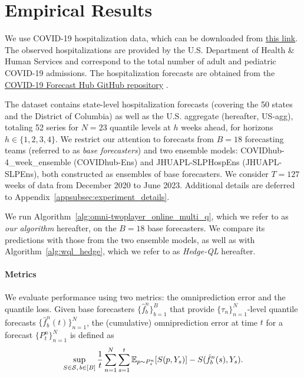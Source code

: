 
\section{Empirical Results}\label{sec:experiments}

We use COVID-19 hospitalization data, which can be downloaded from \href{https://forecast-eval.s3.us-east-2.amazonaws.com/hospitalizations.zip}{this link}. 
The observed hospitalizations are provided by the U.S. Department of Health \& Human Services and correspond to the total number of adult and pediatric COVID-19 admissions. 
The hospitalization forecasts are obtained from the \href{https://github.com/reichlab/covid19-forecast-hub/}{COVID-19 Forecast Hub GitHub repository} \cite{cramer2022covidhub}.

The dataset contains state-level hospitalization forecasts (covering the 50 states and the District of Columbia) as well as the U.S. aggregate (hereafter, US-agg), totaling 52 series for $N=23$ quantile levels at $h$ weeks ahead, for horizons $h \in \{1,2,3,4\}$. 
We restrict our attention to forecasts from $B=18$ forecasting teams (referred to as \emph{base forecasters}) and two ensemble models: COVIDhub-4\_week\_ensemble (COVIDhub-Ens) and JHUAPL-SLPHospEns (JHUAPL-SLPEns), both constructed as ensembles of base forecasters. 
We consider $T=127$ weeks of data from December 2020 to June 2023. 
Additional details are deferred to Appendix~\ref{appsubsec:experiment_details}.

We run Algorithm~\ref{alg:omni-twoplayer_online_multi_q}, which we refer to as \textit{our algorithm} hereafter, on the $B=18$ base forecasters. We compare its predictions with those from the two ensemble models, as well as with Algorithm~\ref{alg:wql_hedge}, which we refer to as \textit{Hedge-QL} hereafter.

\paragraph{Metrics}
We evaluate performance using two metrics: the omniprediction error and the quantile loss. 
Given base forecasters $\{\hat{f}_b^n\}_{b=1}^B$ that provide $\{\tau_n\}_{n=1}^N$-level quantile forecasts $\{\hat{f}_b^n(t)\}_{n=1}^N$, the (cumulative) omniprediction error at time $t$ for a forecast $\{P_t^n\}_{n=1}^N$ is defined as
\begin{align}\label{eq:omni_error_def}
\sup_{S \in \mathcal{S},\, b \in [B]} \frac{1}{t} \sum_{n=1}^N \sum_{s=1}^t \mathbb{E}_{p \sim P_s^n} [S(p, Y_s)] - S(\hat{f}_b^n(s), Y_s).
\end{align}

